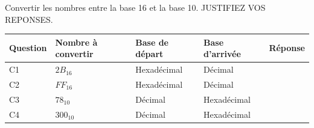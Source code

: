 \begin{Exercise}[title={Conversions de Bases Numériques}]
\Question Convertir les nombres entre la base 16 et la base 10. JUSTIFIEZ VOS REPONSES. \\[0.2cm]
\begin{tabular}{|l|l|l|l|l|}
    \hline
        Question & Nombre à convertir & Base de départ & Base d'arrivée & Réponse \\ \hline
        C1 & $2B_{16}$ & Hexadécimal & Décimal & ~ \\ \hline
        C2 & $FF_{16}$ & Hexadécimal & Décimal & ~ \\ \hline
        C3 & $78_{10}$ & Décimal & Hexadécimal & ~ \\ \hline
        C4 & $300_{10}$  & Décimal & Hexadécimal & ~ \\ \hline
\end{tabular}

\end{Exercise}